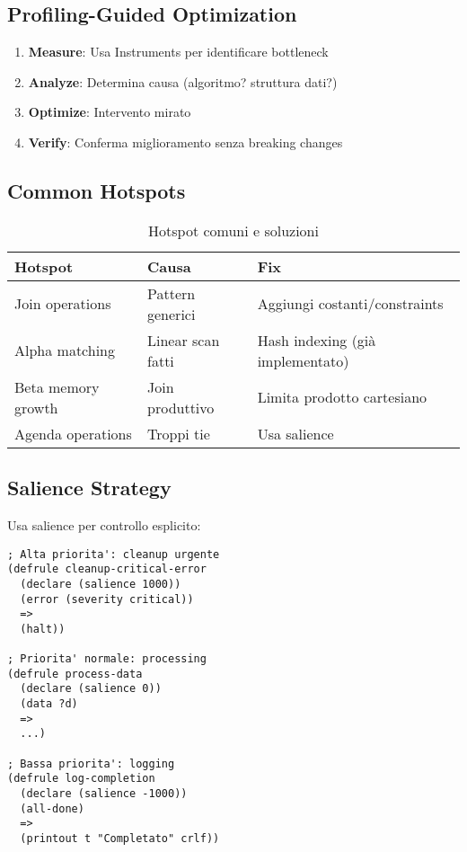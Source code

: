 \subsection{Profiling-Guided Optimization}

\begin{enumerate}
\item \textbf{Measure}: Usa Instruments per identificare bottleneck
\item \textbf{Analyze}: Determina causa (algoritmo? struttura dati?)
\item \textbf{Optimize}: Intervento mirato
\item \textbf{Verify}: Conferma miglioramento senza breaking changes
\end{enumerate}

\subsection{Common Hotspots}

\begin{table}[h]
\centering
\begin{tabular}{@{}lll@{}}
\toprule
\textbf{Hotspot} & \textbf{Causa} & \textbf{Fix} \\
\midrule
Join operations & Pattern generici & Aggiungi costanti/constraints \\
Alpha matching & Linear scan fatti & Hash indexing (già implementato) \\
Beta memory growth & Join produttivo & Limita prodotto cartesiano \\
Agenda operations & Troppi tie & Usa salience \\
\bottomrule
\end{tabular}
\caption{Hotspot comuni e soluzioni}
\label{tab:hotspots}
\end{table}

\subsection{Salience Strategy}

Usa salience per controllo esplicito:

\begin{lstlisting}[language=CLIPS]
; Alta priorita': cleanup urgente
(defrule cleanup-critical-error
  (declare (salience 1000))
  (error (severity critical))
  =>
  (halt))

; Priorita' normale: processing
(defrule process-data
  (declare (salience 0))
  (data ?d)
  =>
  ...)

; Bassa priorita': logging
(defrule log-completion
  (declare (salience -1000))
  (all-done)
  =>
  (printout t "Completato" crlf))
\end{lstlisting}

